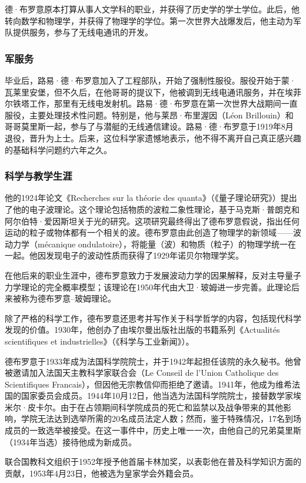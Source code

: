 德·布罗意原本打算从事人文学科的职业，并获得了历史学的学士学位。此后，他转向数学和物理学，并获得了物理学的学位。第一次世界大战爆发后，他主动为军队提供服务，参与了无线电通讯的开发。
\subsubsection{军服务}
毕业后，路易·德·布罗意加入了工程部队，开始了强制性服役。服役开始于蒙·瓦莱里安堡，但不久后，在他哥哥的提议下，他被调到无线电通讯服务，并在埃菲尔铁塔工作，那里有无线电发射机。路易·德·布罗意在第一次世界大战期间一直服役，主要处理技术性问题。特别是，他与莱昂·布里渥因（Léon Brillouin）和哥哥莫里斯一起，参与了与潜艇的无线通信建设。路易·德·布罗意于1919年8月退役，晋升为上士。后来，这位科学家遗憾地表示，他不得不离开自己真正感兴趣的基础科学问题约六年之久。
\subsubsection{科学与教学生涯}  
他的1924年论文《Recherches sur la théorie des quanta》（《量子理论研究》）提出了他的电子波理论。这个理论包括物质的波粒二象性理论，基于马克斯·普朗克和阿尔伯特·爱因斯坦关于光的研究。这项研究最终得出了德布罗意假说，指出任何运动的粒子或物体都有一个相关的波。德布罗意由此创造了物理学的新领域——波动力学（mécanique ondulatoire），将能量（波）和物质（粒子）的物理学统一在一起。他因发现电子的波动性质而获得了1929年诺贝尔物理学奖。

在他后来的职业生涯中，德布罗意致力于发展波动力学的因果解释，反对主导量子力学理论的完全概率模型；该理论在1950年代由大卫·玻姆进一步完善。此理论后来被称为德布罗意–玻姆理论。

除了严格的科学工作，德布罗意还思考并写作关于科学哲学的内容，包括现代科学发现的价值。1930年，他创办了由埃尔曼出版社出版的书籍系列《Actualités scientifiques et industrielles》（《科学与工业新闻》）。

德布罗意于1933年成为法国科学院院士，并于1942年起担任该院的永久秘书。他曾被邀请加入法国天主教科学家联合会（Le Conseil de l'Union Catholique des Scientifiques Francais），但因他无宗教信仰而拒绝了邀请。1941年，他成为维希法国的国家委员会成员。1944年10月12日，他当选为法国科学院院士，接替数学家埃米尔·皮卡尔。由于在占领期间科学院成员的死亡和监禁以及战争带来的其他影响，学院无法达到选举所需的20名成员法定人数；然而，鉴于特殊情况，17名到场成员的一致选举被接受。在这一事件中，历史上唯一一次，由他自己的兄弟莫里斯（1934年当选）接待他成为新成员。

联合国教科文组织于1952年授予他首届卡林加奖，以表彰他在普及科学知识方面的贡献，1953年4月23日，他被选为皇家学会外籍会员。


